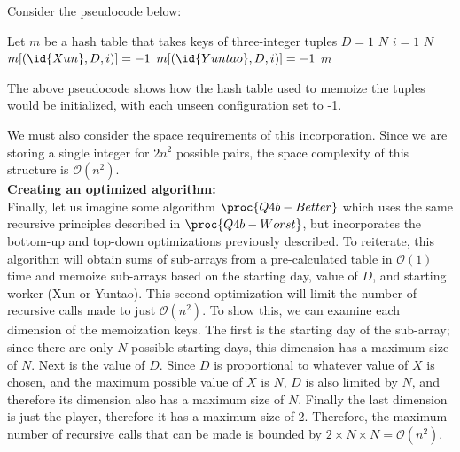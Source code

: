Consider the pseudocode below:

\begin{spacing}{1.2}
    \begin{codebox}
        \li Let $m$ be a hash table that takes keys of three-integer tuples
        \li \For $D = 1$ \To $N$
        \Do
        \li \For $i = 1$ \To $N$
        \Do
        \li $m[(\id{Xun}, D, i)] = -1$
        \li $m[(\id{Yuntao}, D, i)] = -1$
        \End
        \End
        \li \Return $m$
    \end{codebox}
\end{spacing}
\vspace{5mm}

The above pseudocode shows how the hash table used to memoize the tuples would be initialized, with each unseen configuration set to -1.

We must also consider the space requirements of this incorporation. Since we are storing a single integer for $2n^2$ possible pairs, the space complexity of this structure is $\mathcal{O}(n^2)$. \\

\textbf{Creating an optimized algorithm: }\\
Finally, let us imagine some algorithm $\proc{Q4b-Better}$ which uses the same recursive principles described in $\proc{Q4b-Worst}$, but incorporates the bottom-up and top-down optimizations previously described.
To reiterate, this algorithm will obtain sums of sub-arrays from a pre-calculated table in $\mathcal{O}(1)$ time and memoize sub-arrays based on the starting day, value of $D$, and starting worker (Xun or Yuntao).
This second optimization will limit the number of recursive calls made to just $\mathcal{O}(n^2)$.
To show this, we can examine each dimension of the memoization keys.
The first is the starting day of the sub-array; since there are only $N$ possible starting days, this dimension has a maximum size of $N$.
Next is the value of $D$.
Since $D$ is proportional to whatever value of $X$ is chosen, and the maximum possible value of $X$ is $N$, $D$ is also limited by $N$, and therefore its dimension also has a maximum size of $N$.
Finally the last dimension is just the player, therefore it has a maximum size of 2.
Therefore, the maximum number of recursive calls that can be made is bounded by $2 \times N \times N = \mathcal{O}(n^2)$. \\

